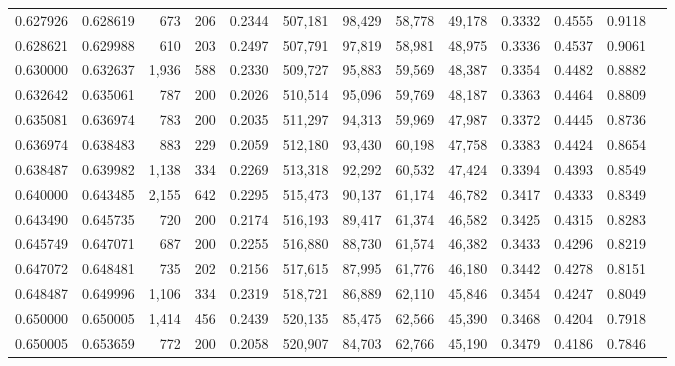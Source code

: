 \begin{tabular}{rrrrrrrrrrrrr}
0.627926 & 0.628619 &   673 & 206 &                                     0.2344 & 507,181 &  98,429 &  58,778 &  49,178 & 0.3332 & 0.4555 & 0.9118 \\
0.628621 & 0.629988 &   610 & 203 &                                     0.2497 & 507,791 &  97,819 &  58,981 &  48,975 & 0.3336 & 0.4537 & 0.9061 \\
0.630000 & 0.632637 & 1,936 & 588 &                                     0.2330 & 509,727 &  95,883 &  59,569 &  48,387 & 0.3354 & 0.4482 & 0.8882 \\
0.632642 & 0.635061 &   787 & 200 &                                     0.2026 & 510,514 &  95,096 &  59,769 &  48,187 & 0.3363 & 0.4464 & 0.8809 \\
0.635081 & 0.636974 &   783 & 200 &                                     0.2035 & 511,297 &  94,313 &  59,969 &  47,987 & 0.3372 & 0.4445 & 0.8736 \\
0.636974 & 0.638483 &   883 & 229 &                                     0.2059 & 512,180 &  93,430 &  60,198 &  47,758 & 0.3383 & 0.4424 & 0.8654 \\
0.638487 & 0.639982 & 1,138 & 334 &                                     0.2269 & 513,318 &  92,292 &  60,532 &  47,424 & 0.3394 & 0.4393 & 0.8549 \\
0.640000 & 0.643485 & 2,155 & 642 &                                     0.2295 & 515,473 &  90,137 &  61,174 &  46,782 & 0.3417 & 0.4333 & 0.8349 \\
0.643490 & 0.645735 &   720 & 200 &                                     0.2174 & 516,193 &  89,417 &  61,374 &  46,582 & 0.3425 & 0.4315 & 0.8283 \\
0.645749 & 0.647071 &   687 & 200 &                                     0.2255 & 516,880 &  88,730 &  61,574 &  46,382 & 0.3433 & 0.4296 & 0.8219 \\
0.647072 & 0.648481 &   735 & 202 &                                     0.2156 & 517,615 &  87,995 &  61,776 &  46,180 & 0.3442 & 0.4278 & 0.8151 \\
0.648487 & 0.649996 & 1,106 & 334 &                                     0.2319 & 518,721 &  86,889 &  62,110 &  45,846 & 0.3454 & 0.4247 & 0.8049 \\
0.650000 & 0.650005 & 1,414 & 456 &                                     0.2439 & 520,135 &  85,475 &  62,566 &  45,390 & 0.3468 & 0.4204 & 0.7918 \\
0.650005 & 0.653659 &   772 & 200 &                                     0.2058 & 520,907 &  84,703 &  62,766 &  45,190 & 0.3479 & 0.4186 & 0.7846 \\

\end{tabular}
